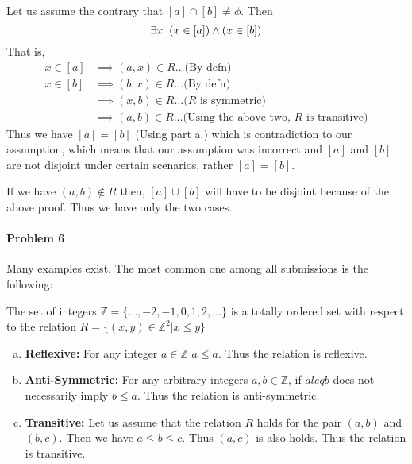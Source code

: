 \documentclass[12pt]{scrartcl}
\begin{document}
\begin{enumerate}[a.]
        Let us assume the contrary that $[a] \cap [b] \neq \phi$. Then 
        \[
            \exists x \hspace{2mm} (x \in [a]) \wedge (x \in [b])
        \]
        That is,
        \begin{align*}
            x \in [a] &\implies (a, x) \in R \ldots \text{(By defn)} \\
            x \in [b] &\implies (b, x) \in R \ldots \text{(By defn)} \\
                      &\implies (x, b) \in R \ldots \text{($R$ is symmetric)}\\
                      &\implies (a, b) \in R \ldots \text{(Using the above two, $R$ is transitive)}
        \end{align*}
        Thus we have $[a] = [b]$ (Using part a.) which is contradiction to our assumption, which means that our assumption was incorrect and $[a]$ and $[b]$ are not disjoint under certain scenarios, rather $[a] = [b]$.
        
        If we have $(a, b) \notin R$ then, $[a] \cup [b]$ will have to be disjoint because of the above proof. Thus we have only the two cases.
    \end{enumerate}

\paragraph*{Problem 6} 

    Many examples exist. The most common one among all submissions is the following:
    
    The set of integers $\mathbb{Z} = \{\ldots, -2, -1, 0, 1, 2, \ldots \}$ is a totally ordered set with respect to the relation $R = \{(x, y) \in \mathbb{Z}^2 | x \leq y \}$
    \begin{enumerate}[a.]
        \item \textbf{Reflexive:} For any integer $a \in \mathbb{Z}$ $a \leq a$. Thus the relation is reflexive.
        \item \textbf{Anti-Symmetric:} For any arbitrary integers $a, b \in \mathbb{Z}$, if $a leq b$ does not necessarily imply $b \leq a$. Thus the relation is anti-symmetric.
        \item \textbf{Transitive:} Let us assume that the relation $R$ holds for the pair $(a, b)$ and $(b, c)$. Then we have $a \leq b \leq c$. Thus $(a, c)$ is also holds. Thus the relation is transitive.
    \end{enumerate}
\end{document}

